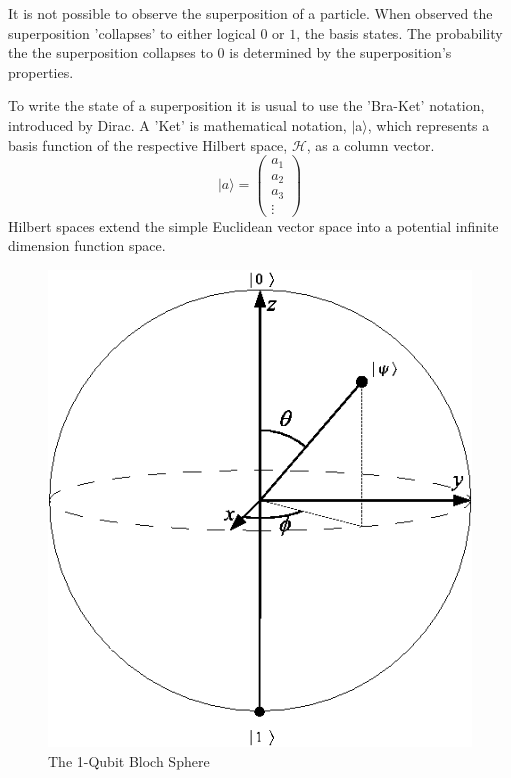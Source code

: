 \documentclass[authoryearcitations]{UoYCSproject}
\begin{document}
It is not possible to observe the superposition of a particle.
When observed the superposition 'collapses' to either logical $0$ or $1$, the basis states.
The probability the the superposition collapses to $0$ is determined by the superposition's properties.

To write the state of a superposition it is usual to use the 'Bra-Ket' notation, introduced by Dirac\cite{dirac2004principles}.
A 'Ket' is mathematical notation, $\vert$a$\rangle$, which represents a basis function of the respective Hilbert space, $\mathcal{H}$, as a column vector.
\begin{equation}
\vert
a
\rangle = 
\begin{pmatrix}
a_1\\
a_2\\
a_3\\
\vdots
\end{pmatrix}
\end{equation}
Hilbert spaces extend the simple Euclidean vector space into a potential infinite dimension function space.
\begin{figure}
\centering
\includegraphics[scale=0.5]{Bloch}
\caption{The 1-Qubit Bloch Sphere \cite{QuantikiBlochSphereImage}}
\label{BlochSphere}
\end{figure}
\end{document}
